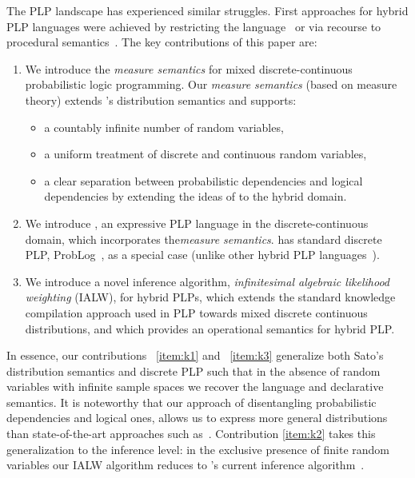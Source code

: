 The PLP landscape has experienced similar struggles. First approaches for  hybrid PLP languages were achieved by restricting the language~\citep{gutmann2010extending,gutmann2011magic,islam2012inference} or via recourse to procedural semantics~\citep{nitti2016probabilistic}.  The key contributions of this paper are:

\begin{enumerate}[label={\bf C\arabic*}]
  \setcounter{enumi}{0}
\item We introduce the {\em measure semantics} for mixed discrete-continuous probabilistic logic programming.
Our {\em measure semantics} (based on measure theory) extends \citeauthor{sato1995statistical}'s distribution semantics and supports:
\begin{itemize}
    \item  \label{item:k1} a countably infinite number of random variables,
     \item a uniform treatment of discrete and continuous random variables,
      \item a clear separation between probabilistic dependencies and logical dependencies by extending the ideas of \citet{poole2010probabilistic} to the hybrid domain.
    \end{itemize}
\item \label{item:k3} We introduce \dcproblogsty, an expressive PLP language in the discrete-continuous domain,
which incorporates the{\em measure semantics}. 
 \dcproblogsty has standard discrete PLP, \eg ProbLog~\citep{fierens2015inference}, as a special case (unlike other hybrid PLP languages~\citep{gutmann2011magic,nitti2016probabilistic}).
    \item \label{item:k2}  We introduce a novel inference algorithm, {\em infinitesimal algebraic likelihood weighting} (IALW), for hybrid PLPs,
which extends the standard knowledge compilation approach used in PLP towards mixed discrete continuous distributions, and  which 
provides an operational semantics for hybrid PLP.
\end{enumerate}


In essence, our contributions ~\ref{item:k1} and ~\ref{item:k3} generalize both  Sato's distribution semantics and discrete PLP such that in the absence of random variables with infinite sample spaces we recover the \problogsty language and declarative semantics. It is noteworthy that our approach of disentangling probabilistic dependencies and logical ones, allows us to express more general distributions than state-of-the-art approaches such as~\citep{gutmann2011magic,nitti2016probabilistic,azzolini2021semantics}. 
Contribution \ref{item:k2} takes this generalization to the inference level: in the exclusive presence of finite random variables our IALW algorithm reduces to \problogsty's current inference algorithm~\citep{fierens2015inference}.












